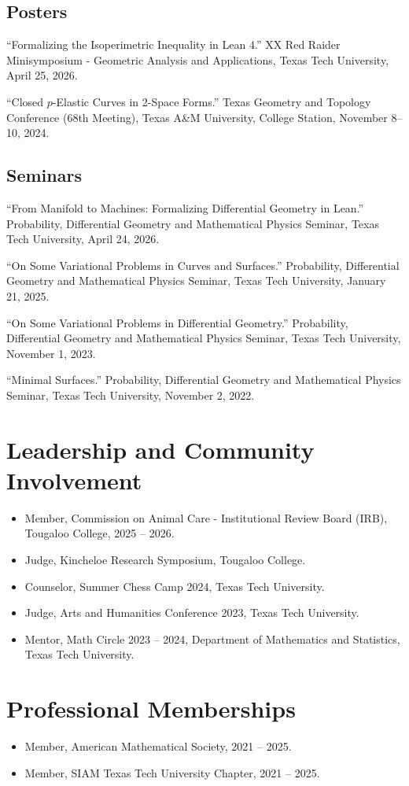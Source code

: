 \documentclass[11pt]{article}
\begin{document}
\subsection*{Posters}
\begin{etaremune}
	\item ``Formalizing the Isoperimetric Inequality in Lean 4.'' XX Red Raider Minisymposium - Geometric Analysis and Applications, Texas Tech University, April 25, 2026.
	\item ``Closed $p$-Elastic Curves in 2-Space Forms.'' Texas Geometry and Topology Conference (68th Meeting), Texas A\&M University, College Station, November 8--10, 2024.
\end{etaremune}

\subsection*{Seminars}
\begin{etaremune}
	\item ``From Manifold to Machines: Formalizing Differential Geometry in Lean.'' Probability, Differential Geometry and Mathematical Physics Seminar, Texas Tech University, April 24, 2026.
	\item ``On Some Variational Problems in Curves and Surfaces.'' Probability, Differential Geometry and Mathematical Physics Seminar, Texas Tech University, January 21, 2025.
	\item ``On Some Variational Problems in Differential Geometry.'' Probability, Differential Geometry and Mathematical Physics Seminar, Texas Tech University, November 1, 2023.
	\item ``Minimal Surfaces.'' Probability, Differential Geometry and Mathematical Physics Seminar, Texas Tech University, November 2, 2022.
\end{etaremune}

\section*{Leadership and Community Involvement}

\begin{itemize}
	\item Member, Commission on Animal Care - Institutional Review Board (IRB), Tougaloo College, 2025 -- 2026.
	\item Judge, Kincheloe Research Symposium, Tougaloo College.
	\item Counselor, Summer Chess Camp 2024, Texas Tech University.
	\item Judge, Arts and Humanities Conference 2023, Texas Tech University.
	\item Mentor, Math Circle 2023 -- 2024, Department of Mathematics and Statistics, Texas Tech University.
\end{itemize}

\section*{Professional Memberships}

\begin{itemize}
	\item Member, American Mathematical Society, 2021 -- 2025.
	\item Member, SIAM Texas Tech University Chapter, 2021 -- 2025.
\end{itemize}
\end{document}
